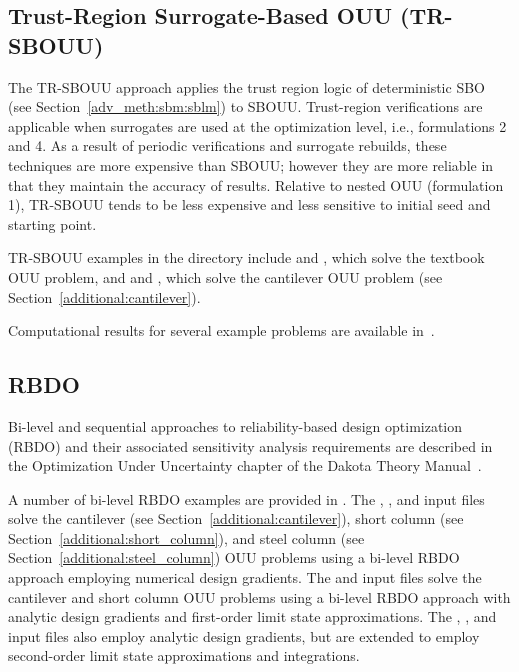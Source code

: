 \subsection{Trust-Region Surrogate-Based OUU (TR-SBOUU)}\label{adv_models:ouu:trsb}

The TR-SBOUU approach applies the trust region logic of deterministic
SBO (see Section~\ref{adv_meth:sbm:sblm}) to SBOUU. Trust-region verifications
are applicable when surrogates are used at the optimization level,
i.e., formulations 2 and 4. As a result of periodic verifications and
surrogate rebuilds, these techniques are more expensive than SBOUU;
however they are more reliable in that they maintain the accuracy of
results. Relative to nested OUU (formulation 1), TR-SBOUU tends to be
less expensive and less sensitive to initial seed and starting point.

TR-SBOUU examples in the  directory include
 and
, which solve the textbook OUU
problem, and  and
, which solve the cantilever
OUU problem (see Section~\ref{additional:cantilever}).

Computational results for several example problems are available
in~\cite{Eld02}.

\subsection{RBDO} \label{adv_models:ouu:rbdo}

Bi-level and sequential approaches to reliability-based design
optimization (RBDO) and their associated sensitivity analysis
requirements are described in the Optimization Under Uncertainty
chapter of the Dakota Theory Manual~\cite{TheoMan}.

A number of bi-level RBDO examples are provided in .
The ,
, and
 input files solve the
cantilever (see Section~\ref{additional:cantilever}), short column
(see Section~\ref{additional:short_column}), and steel column (see
Section~\ref{additional:steel_column}) OUU problems using a bi-level
RBDO approach employing numerical design gradients. The 
 and
 input files solve
the cantilever and short column OUU problems using a bi-level RBDO
approach with analytic design gradients and first-order limit state
approximations. The ,
, and
 input files also
employ analytic design gradients, but are extended to employ
second-order limit state approximations and integrations.

